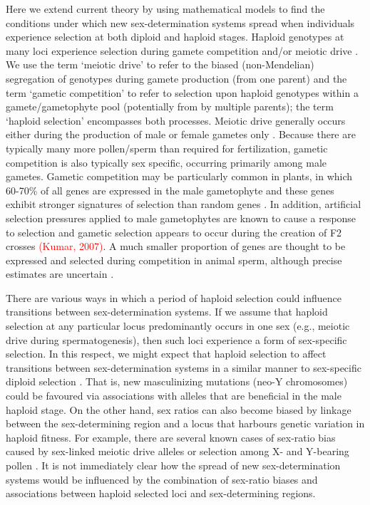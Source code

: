 \documentclass[12pt]{article}
\begin{document}
Here we extend current theory %
by using mathematical models to find the conditions under which new sex-determination systems spread when individuals experience selection at both diploid and haploid stages. 
Haploid genotypes at many loci experience selection during gamete competition and/or meiotic drive \citep{Mulcahy:1996ha,JOSEPH:2004haa}.
We use the term `meiotic drive' to refer to the biased (non-Mendelian) segregation of genotypes during gamete production (from one parent) and the term `gametic competition' to refer to selection upon haploid genotypes within a gamete/gametophyte pool (potentially from by multiple parents); the term `haploid selection' encompasses both processes. 
Meiotic drive generally occurs either during the production of male or female gametes only \citep{Ubeda:2005gw,Lindholm:2016cw}.
Because there are typically many more pollen/sperm than required for fertilization, gametic competition is also typically sex specific, occurring primarily among male gametes.
Gametic competition may be particularly common in plants, in which 60-70\% of all genes are expressed in the male gametophyte and these genes exhibit stronger signatures of selection than random genes \citep{Borg:2009jpa,Arunkumar:2013iq,Gossmann:2014dua}.
In addition, artificial selection pressures applied to male gametophytes are known to cause a response to selection \citep[e.g.,][]{Hormaza:1996cv,Ravikumar:2003uo,Hedhly:2004iv,Clarke:2004ir} and gametic selection appears to occur during the creation of F2 crosses \textcolor{red}{(Kumar, 2007)}. 
A much smaller proportion of genes are thought to be expressed and selected during competition in animal sperm, although precise estimates are uncertain \citep{Zheng:2001fi,JOSEPH:2004haa,Vibranovski:2010et,Immler:2014im}. 

There are various ways in which a period of haploid selection could influence transitions between sex-determination systems. 
If we assume that haploid selection at any particular locus predominantly occurs in one sex (e.g., meiotic drive during spermatogenesis), then such loci experience a form of sex-specific selection. 
In this respect, we might expect that haploid selection to affect transitions between sex-determination systems in a similar manner to sex-specific diploid selection \citep[as explored by][]{vanDoorn:2007eu,vanDoorn:2010hu}. 
That is, new masculinizing mutations (neo-Y chromosomes) could be favoured via associations with alleles that are beneficial in the male haploid stage. 
On the other hand, sex ratios can also become biased by linkage between the sex-determining region and a locus that harbours genetic variation in haploid fitness. 
For example, there are several known cases of sex-ratio bias caused by sex-linked meiotic drive alleles \citep[][Chapter 3]{Burt:2006} or selection among X- and Y-bearing pollen \citep{Lloyd:1974tz,Conn:1981uw,Stehlik:2005ul,Stehlik:2006to,Field:2012fd,Field:2013cc}. 
It is not immediately clear how the spread of new sex-determination systems would be influenced by the combination of sex-ratio biases and associations between haploid selected loci and sex-determining regions. 
\end{document}
